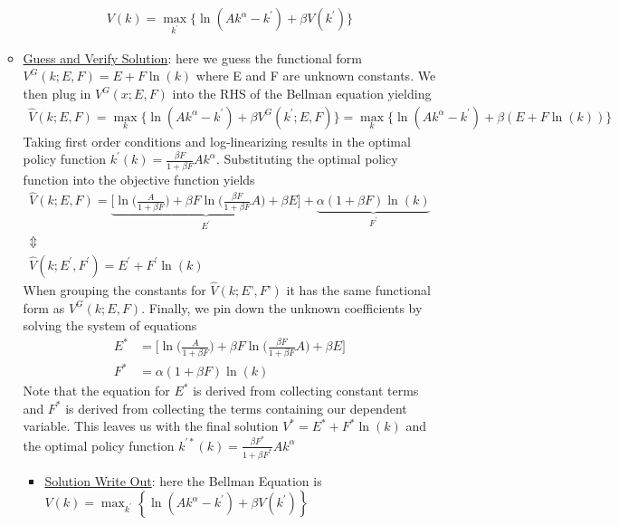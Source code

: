 \documentclass{article}
\begin{document}
\begin{itemize}
\begin{itemize}
        \begin{gather*}
            V(k) = \max_{k^{'}} \{ \ln(Ak^{\alpha} − k^{'}) + \beta V(k^{'}) \}
        \end{gather*}
        \item  \underline{Guess and Verify Solution}: here we guess the functional form $V^{G}(k; E, F) = E + F \ln (k)$ where E and F are unknown constants. We then plug in $V^{G}(x; E, F)$ into the RHS of the Bellman equation yielding
        \begin{gather*}
            \widehat{V}(k; E, F) = \max_{k} \Big\{ \ln(Ak^{\alpha} - k^{'}) + \beta V^{G}(k^{'}; E, F) \Big\} = \max_{k} \Big\{ \ln(Ak^{\alpha} - k^{'}) + \beta(E + F \ln (k)) \Big\}
        \end{gather*}
         Taking first order conditions and log-linearizing results in the optimal policy function $k^{'}(k) = \frac{\beta F}{1 + \beta F}Ak^{\alpha}$. Substituting the optimal policy function into the objective function yields
         \begin{gather*}
             \widehat{V}(k;E,F) = \underbrace{\bigg[ \ln \Big(\frac{A}{1+\beta F} \Big) + \beta F \ln \Big( \frac{\beta F}{1 + \beta F} A \Big) + \beta E \bigg]}_{E^{'}} + \underbrace{\alpha(1+\beta F) \ln(k)}_{F^{'}} \\
             \Updownarrow \\
             \widehat{V}(k; E^{'}, F^{'}) = E^{'} + F^{'} \ln(k)
         \end{gather*}
         When grouping the constants for $\widehat{V}(k; E’, F’)$ it has the same functional form as $V^{G}(k; E, F)$. Finally, we pin down the unknown coefficients by solving the system of equations
         \begin{align*}
             E^{*} &= \bigg[ \ln \Big(\frac{A}{1+\beta F} \Big) + \beta F \ln \Big( \frac{\beta F}{1 + \beta F} A \Big) + \beta E \bigg] \\
             F^{*} &= \alpha(1+\beta F) \ln(k)
         \end{align*}
         Note that the equation for $E^{*}$ is derived from collecting constant terms and $F^{*}$ is derived from collecting the terms containing our dependent variable. This leaves us with the final solution $V^{*} = E^{*} + F^{*} \ln (k)$ and the optimal policy function $k^{'*}(k) = \frac{\beta F^{*}}{1 + \beta F^{*}} A k^{\alpha}$
         \begin{itemize}
             \item \underline{Solution Write Out}: here the Bellman Equation is $V(k) = \max_{k^{'}} \left\{ \ln(A k^{\alpha} - k^{'}) + \beta V(k^{'}) \right\}$

\end{itemize}
\end{itemize}
\end{itemize}
\end{document}
